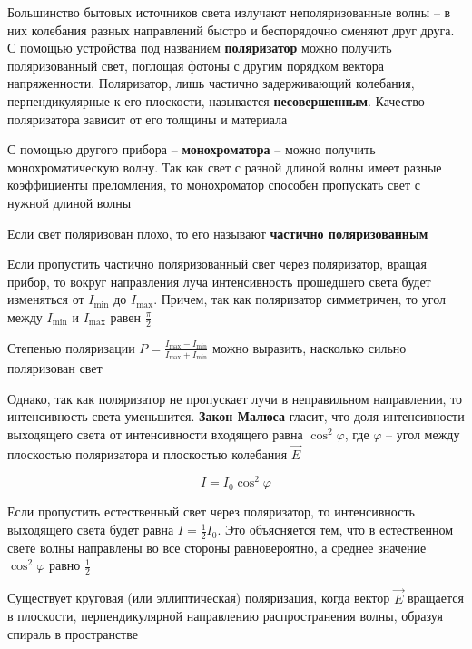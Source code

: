 Большинство бытовых источников света излучают неполяризованные волны -- в них колебания разных направлений быстро и беспорядочно сменяют друг друга. С помощью устройства под названием \textbf{поляризатор} можно получить поляризованный свет, поглощая фотоны с другим порядком вектора напряженности. Поляризатор, лишь частично задерживающий колебания, перпендикулярные к его плоскости, называется \textbf{несовершенным}. Качество поляризатора зависит от его толщины и материала

С помощью другого прибора -- \textbf{монохроматора} -- можно получить монохроматическую волну. Так как свет с разной длиной волны имеет разные коэффициенты преломления, то монохроматор способен пропускать свет с нужной длиной волны

Если свет поляризован плохо, то его называют \textbf{частично поляризованным}


Если пропустить частично поляризованный свет через поляризатор, вращая прибор, то вокруг направления луча интенсивность прошедшего света будет изменяться от $I_{\min}$ до $I_{\max}$. Причем, так как поляризатор симметричен, то угол между $I_{\min}$ и $I_{\max}$ равен $\frac{\pi}{2}$

Степенью поляризации $P = \frac{I_{\max} - I_{\min}}{I_{\max} + I_{\min}}$ можно выразить, насколько сильно поляризован свет 

\mediumvspace

Однако, так как поляризатор не пропускает лучи в неправильном направлении, то интенсивность света уменьшится. \textbf{Закон Малюса} гласит, что доля интенсивности выходящего света от интенсивности входящего равна $\cos^2 \varphi$, где $\varphi$ -- угол между плоскостью поляризатора и плоскостью колебания $\vec E$

\[I = I_0 \cos^2 \varphi\]

Если пропустить естественный свет через поляризатор, то интенсивность выходящего света будет равна $I = \frac{1}{2} I_0$. Это объясняется тем, что в естественном свете волны направлены во все стороны равновероятно, а среднее значение $\cos^2 \varphi$ равно $\frac{1}{2}$

\mediumvspace

Существует круговая (или эллиптическая) поляризация, когда вектор $\vec E$ вращается в плоскости, перпендикулярной направлению распространения волны, образуя спираль в пространстве

